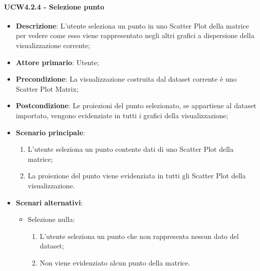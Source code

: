 \paragraph{UCW4.2.4 - Selezione punto}
\label{par:ucw4.2.4}
\begin{itemize}
    \item \textbf{Descrizione}: L'utente seleziona un punto in uno Scatter Plot della matrice per vedere come
                                esso viene rappresentato negli altri grafici a dispersione della visualizzazione corrente;

    \item \textbf{Attore primario}: Utente;

    \item \textbf{Precondizione}:   La visualizzazione costruita dal dataset corrente è uno Scatter Plot Matrix;
    \item \textbf{Postcondizione}:  Le proiezioni del punto selezionato, se appartiene al dataset importato,
                                    vengono evidenziate in tutti i grafici della visualizzazione;

	\item \textbf{Scenario principale}:
        \begin{enumerate}
            \item L'utente seleziona un punto contente dati di uno Scatter Plot della matrice;
            \item La proiezione del punto viene evidenziata in tutti gli Scatter Plot della visualizzazione.
        \end{enumerate}

    \item \textbf{Scenari alternativi}:
    \begin{itemize}
        \item Selezione nulla:
        \begin{enumerate}
            \item L'utente seleziona un punto che non rappresenta nessun dato del dataset;
            \item Non viene evidenziato alcun punto della matrice.
        \end{enumerate}
    \end{itemize}

\end{itemize}


